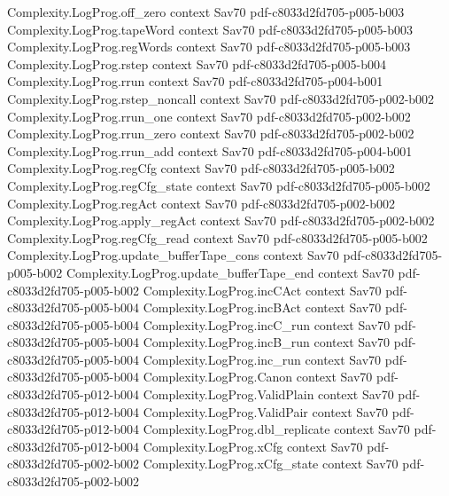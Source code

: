 \begin{theorem}
\proofstep
  {Complexity.LogProg.off_zero}
  {context}
  {Sav70}
  {pdf-c8033d2fd705-p005-b003}
\proofstep
  {Complexity.LogProg.tapeWord}
  {context}
  {Sav70}
  {pdf-c8033d2fd705-p005-b003}
\proofstep
  {Complexity.LogProg.regWords}
  {context}
  {Sav70}
  {pdf-c8033d2fd705-p005-b003}
\proofstep
  {Complexity.LogProg.rstep}
  {context}
  {Sav70}
  {pdf-c8033d2fd705-p005-b004}
\proofstep
  {Complexity.LogProg.rrun}
  {context}
  {Sav70}
  {pdf-c8033d2fd705-p004-b001}
\proofstep
  {Complexity.LogProg.rstep_noncall}
  {context}
  {Sav70}
  {pdf-c8033d2fd705-p002-b002}
\proofstep
  {Complexity.LogProg.rrun_one}
  {context}
  {Sav70}
  {pdf-c8033d2fd705-p002-b002}
\proofstep
  {Complexity.LogProg.rrun_zero}
  {context}
  {Sav70}
  {pdf-c8033d2fd705-p002-b002}
\proofstep
  {Complexity.LogProg.rrun_add}
  {context}
  {Sav70}
  {pdf-c8033d2fd705-p004-b001}
\proofstep
  {Complexity.LogProg.regCfg}
  {context}
  {Sav70}
  {pdf-c8033d2fd705-p005-b002}
\proofstep
  {Complexity.LogProg.regCfg_state}
  {context}
  {Sav70}
  {pdf-c8033d2fd705-p005-b002}
\proofstep
  {Complexity.LogProg.regAct}
  {context}
  {Sav70}
  {pdf-c8033d2fd705-p002-b002}
\proofstep
  {Complexity.LogProg.apply_regAct}
  {context}
  {Sav70}
  {pdf-c8033d2fd705-p002-b002}
\proofstep
  {Complexity.LogProg.regCfg_read}
  {context}
  {Sav70}
  {pdf-c8033d2fd705-p005-b002}
\proofstep
  {Complexity.LogProg.update_bufferTape_cons}
  {context}
  {Sav70}
  {pdf-c8033d2fd705-p005-b002}
\proofstep
  {Complexity.LogProg.update_bufferTape_end}
  {context}
  {Sav70}
  {pdf-c8033d2fd705-p005-b002}
\proofstep
  {Complexity.LogProg.incCAct}
  {context}
  {Sav70}
  {pdf-c8033d2fd705-p005-b004}
\proofstep
  {Complexity.LogProg.incBAct}
  {context}
  {Sav70}
  {pdf-c8033d2fd705-p005-b004}
\proofstep
  {Complexity.LogProg.incC_run}
  {context}
  {Sav70}
  {pdf-c8033d2fd705-p005-b004}
\proofstep
  {Complexity.LogProg.incB_run}
  {context}
  {Sav70}
  {pdf-c8033d2fd705-p005-b004}
\proofstep
  {Complexity.LogProg.inc_run}
  {context}
  {Sav70}
  {pdf-c8033d2fd705-p005-b004}
\proofstep
  {Complexity.LogProg.Canon}
  {context}
  {Sav70}
  {pdf-c8033d2fd705-p012-b004}
\proofstep
  {Complexity.LogProg.ValidPlain}
  {context}
  {Sav70}
  {pdf-c8033d2fd705-p012-b004}
\proofstep
  {Complexity.LogProg.ValidPair}
  {context}
  {Sav70}
  {pdf-c8033d2fd705-p012-b004}
\proofstep
  {Complexity.LogProg.dbl_replicate}
  {context}
  {Sav70}
  {pdf-c8033d2fd705-p012-b004}
\proofstep
  {Complexity.LogProg.xCfg}
  {context}
  {Sav70}
  {pdf-c8033d2fd705-p002-b002}
\proofstep
  {Complexity.LogProg.xCfg_state}
  {context}
  {Sav70}
  {pdf-c8033d2fd705-p002-b002}

\end{theorem}
